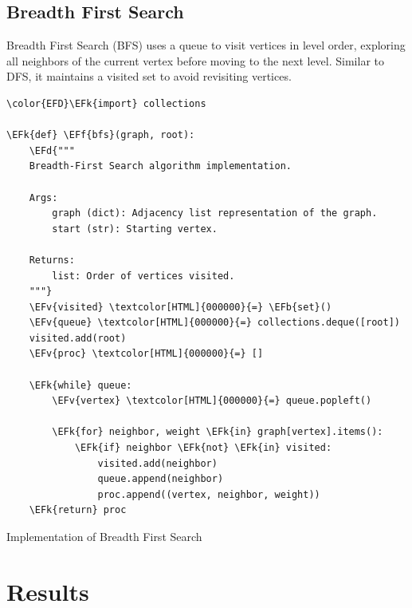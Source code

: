 \documentclass[a4paper,12pt]{article}
\newcommand{\EFd}[1]{\textcolor{EFd}{#1}} %
\newcommand{\EFk}[1]{\textcolor{EFk}{#1}} %
\newcommand{\EFb}[1]{\textcolor{EFb}{#1}} %
\newcommand{\EFf}[1]{\textcolor{EFf}{#1}} %
\newcommand{\EFv}[1]{\textcolor{EFv}{#1}} %
\begin{document}
\subsection{Breadth First Search}
\label{sec:org426d30d}
Breadth First Search (BFS) uses a queue to visit vertices in level order, exploring all neighbors of the current vertex before moving to the next level. Similar to DFS, it maintains a visited set to avoid revisiting vertices.

\begin{listing}[htbp]
\begin{Code}
\begin{Verbatim}
\color{EFD}\EFk{import} collections

\EFk{def} \EFf{bfs}(graph, root):
    \EFd{"""
    Breadth-First Search algorithm implementation.

    Args:
        graph (dict): Adjacency list representation of the graph.
        start (str): Starting vertex.

    Returns:
        list: Order of vertices visited.
    """}
    \EFv{visited} \textcolor[HTML]{000000}{=} \EFb{set}()
    \EFv{queue} \textcolor[HTML]{000000}{=} collections.deque([root])
    visited.add(root)
    \EFv{proc} \textcolor[HTML]{000000}{=} []

    \EFk{while} queue:
        \EFv{vertex} \textcolor[HTML]{000000}{=} queue.popleft()

        \EFk{for} neighbor, weight \EFk{in} graph[vertex].items():
            \EFk{if} neighbor \EFk{not} \EFk{in} visited:
                visited.add(neighbor)
                queue.append(neighbor)
                proc.append((vertex, neighbor, weight))
    \EFk{return} proc
\end{Verbatim}
\end{Code}
\caption{\label{lst:orgfe8927a}Implementation of Breadth First Search}
\end{listing}
\section{Results}
\label{sec:org72c0b3e}
\end{document}
